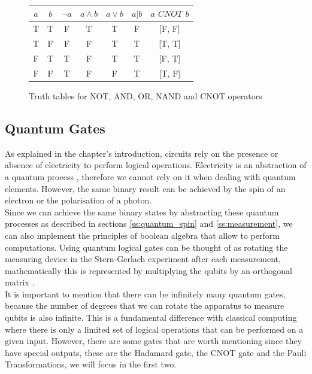 \documentclass[12pt,a4paper]{scrartcl}
\begin{document}
\begin{figure}[H]
    \centering
    \begin{tabular}{|c|c|c|c|c|c|c|} 
    \hline
    $a$ & $b$ & $\lnot{a}$ &$a\wedge{b}$ & $a\lor{b}$ & $a|b$ & $a$ $CNOT$ $b$ \\
    \hline
    T & T & F & T & T & F & [F, F] \\
    T & F & F & F & T & T & [T, T] \\
    F & T & T & F & T & T & [F, T] \\
    F & F & T & F & F & T & [T, F] \\
    \hline
    \end{tabular}
    \caption{Truth tables for NOT, AND, OR, NAND and CNOT operators}
    \label{table:truthtablesvarious}
\end{figure}


\subsection{Quantum Gates}\label{section_quantum_gates}

As explained in the chapter's introduction, circuits rely on the presence or absence of electricity to perform logical operations. Electricity is an abstraction of a quantum process \cite{Longair2013}, therefore we cannot rely on it when dealing with quantum elements. However, the same binary result can be achieved by the spin of an electron or the polarisation of a photon. \\

Since we can achieve the same binary states by abstracting these quantum processes as described in sections \ref{ss:quantum_spin} and \ref{ss:measurement}, we can also implement the principles of boolean algebra that allow to perform computations. Using quantum logical gates can be thought of as rotating the measuring device in the Stern-Gerlach experiment after each measurement, mathematically this is represented by multiplying the qubits by an orthogonal matrix \cite{bernhardt2019quantum}. \\

It is important to mention that there can be infinitely many quantum gates, because the number of degrees that we can rotate the apparatus to measure qubits is also infinite. This is a fundamental difference with classical computing where there is only a limited set of logical operations that can be performed on a given input. However, there are some gates that are worth mentioning since they have special outputs, these are the Hadamard gate, the CNOT gate and the Pauli Transformations, we will focus in the first two.
\end{document}
